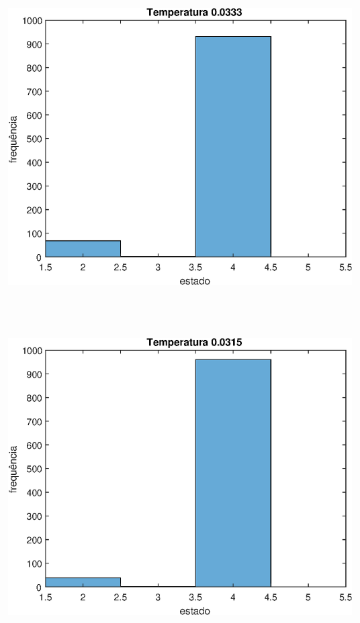 \documentclass[12pt]{article}
\newenvironment{exercise}[2][Exercício]{\begin{trivlist}
\item[\hskip \labelsep {\bfseries #1}\hskip \labelsep {\bfseries #2.}]}{\end{trivlist}}
\begin{document}
\begin{exercise}{2.e}
\begin{figure}[H]
    \centering
    \begin{subfigure}[b]{0.3\textwidth}
        \includegraphics[width=\textwidth]{figs/ex2e_h7.eps}
    \end{subfigure}
    ~ 
    \begin{subfigure}[b]{0.3\textwidth}
        \includegraphics[width=\textwidth]{figs/ex2e_h8.eps}
    \end{subfigure}
    ~
    \begin{subfigure}[b]{0.3\textwidth}

\end{subfigure}
\end{figure}
\end{exercise}
\end{document}
